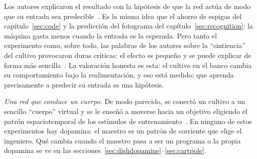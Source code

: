 Los autores explicaron el resultado con la hipótesis de que la red actúa de modo que su entrada sea predecible~\cite{Friston2010}. Es la misma idea que el ahorro de espigas del capítulo~\ref{sec:code} y la predicción del fotograma del capítulo~\ref{sec:recognition}: la máquina gasta menos cuando la entrada es la esperada. Pero tanto el experimento como, sobre todo, las palabras de los autores sobre la “sintiencia” del cultivo provocaron duras críticas: el efecto es pequeño y se puede explicar de forma más sencilla~\cite{Balci2023}. La valoración honesta es esta: el cultivo en el banco cambia su comportamiento bajo la realimentación, y eso está medido; que aprenda precisamente a predecir su entrada es una hipótesis.

\emph{Una red que conduce un cuerpo.} De modo parecido, se conectó un cultivo a un sencillo “cuerpo” virtual y se le enseñó a moverse hacia un objetivo eligiendo el patrón espaciotemporal de los estímulos de entrenamiento~\cite{Bakkum2008}. En ninguno de estos experimentos hay dopamina: el maestro es un patrón de corriente que elige el ingeniero. Qué cambia cuando el maestro pasa a ser un programa o la propia dopamina se ve en las secciones~\ref{sec:dishdopamine}--\ref{sec:cartpole}.

